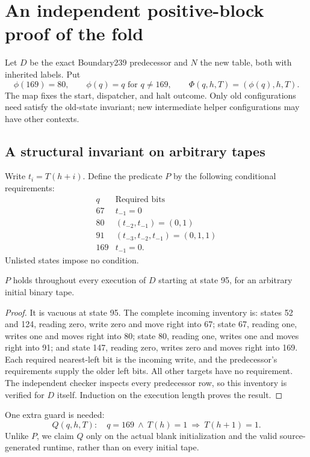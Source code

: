 \section{An independent positive-block proof of the fold}
\label{sec:fold}

Let $D$ be the exact Boundary239 predecessor and $N$ the new table,
both with inherited labels. Put
\[
 \phi(169)=80,\qquad \phi(q)=q\text{ for }q\ne169,
 \qquad
 \Phi(q,h,T)=(\phi(q),h,T).
\]
The map fixes the start, dispatcher, and halt outcome.
Only old configurations need satisfy the old-state invariant;
new intermediate helper configurations may have other contexts.

\subsection{A structural invariant on arbitrary tapes}

Write $t_i=T(h+i)$. Define the predicate $P$ by the following
conditional requirements:
\[
 \begin{array}{c|l}
 q & \text{Required bits}\\ \hline
 67 & t_{-1}=0\\
 80 & (t_{-2},t_{-1})=(0,1)\\
 91 & (t_{-3},t_{-2},t_{-1})=(0,1,1)\\
 169 & t_{-1}=0.
 \end{array}
\]
Unlisted states impose no condition.

\begin{lemma}
$P$ holds throughout every execution of $D$ starting at state 95,
for an arbitrary initial binary tape.
\end{lemma}
\begin{proof}
It is vacuous at state 95. The complete incoming inventory is:
states 52 and 124, reading zero, write zero and move right into 67;
state 67, reading one, writes one and moves right into 80;
state 80, reading one, writes one and moves right into 91; and
state 147, reading zero, writes zero and moves right into 169.
Each required nearest-left bit is the incoming write, and the
predecessor's requirements supply the older left bits. All other
targets have no requirement. The independent checker inspects
every predecessor row, so this inventory is verified for $D$ itself.
Induction on the execution length proves the result.
\end{proof}

One extra guard is needed:
\begin{equation}
 Q(q,h,T):\quad q=169\ \land\ T(h)=1
       \ \Longrightarrow\ T(h+1)=1.
 \label{eq:nextone}
\end{equation}
Unlike $P$, we claim $Q$ only on the actual blank initialization and
the valid source-generated runtime, rather than on every initial
tape.

